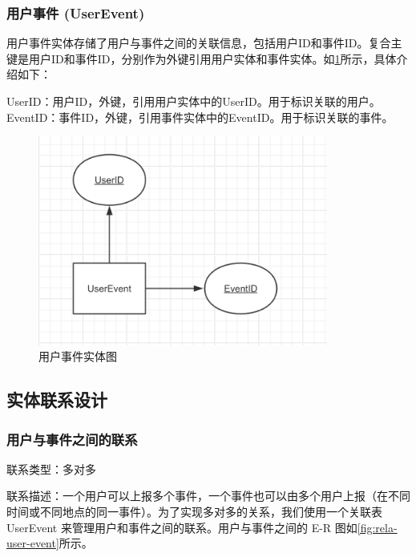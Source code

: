 \subsubsection{用户事件 (UserEvent)}

用户事件实体存储了用户与事件之间的关联信息，包括用户ID和事件ID。复合主键是用户ID和事件ID，分别作为外键引用用户实体和事件实体。如\cref{fig:entity-userevent}所示，具体介绍如下：

UserID：用户ID，外键，引用用户实体中的UserID。用于标识关联的用户。
EventID：事件ID，外键，引用事件实体中的EventID。用于标识关联的事件。

\begin{figure}[h!]
    \centering
    \includegraphics[width=0.85\textwidth]{figures/db-img-05.png}
    \caption{用户事件实体图}
    \label{fig:entity-userevent}
\end{figure}

\subsection{实体联系设计}

\subsubsection{用户与事件之间的联系}

联系类型：多对多

联系描述：一个用户可以上报多个事件，一个事件也可以由多个用户上报（在不同时间或不同地点的同一事件）。为了实现多对多的关系，我们使用一个关联表 UserEvent 来管理用户和事件之间的联系。用户与事件之间的 E-R 图如\cref{fig:rela-user-event}所示。

